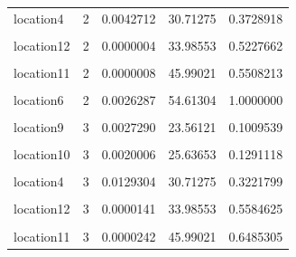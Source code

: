 \documentclass[
]{book}
\begin{document}
\begin{table}[!h]
\begin{tabular}{l|l|r|r|r}
\hline
\cellcolor{gray!6}{location2} & \cellcolor{gray!6}{2} & \cellcolor{gray!6}{0.0070132} & \cellcolor{gray!6}{27.64481} & \cellcolor{gray!6}{0.2575157}\\
\hline
location4 & 2 & 0.0042712 & 30.71275 & 0.3728918\\
\hline
\cellcolor{gray!6}{location5} & \cellcolor{gray!6}{2} & \cellcolor{gray!6}{0.0055479} & \cellcolor{gray!6}{31.35114} & \cellcolor{gray!6}{0.5227547}\\
\hline
location12 & 2 & 0.0000004 & 33.98553 & 0.5227662\\
\hline
\cellcolor{gray!6}{location7} & \cellcolor{gray!6}{2} & \cellcolor{gray!6}{0.0010378} & \cellcolor{gray!6}{35.20967} & \cellcolor{gray!6}{0.5508009}\\
\hline
location11 & 2 & 0.0000008 & 45.99021 & 0.5508213\\
\hline
\cellcolor{gray!6}{location3} & \cellcolor{gray!6}{2} & \cellcolor{gray!6}{0.0140000} & \cellcolor{gray!6}{51.70466} & \cellcolor{gray!6}{0.9289930}\\
\hline
location6 & 2 & 0.0026287 & 54.61304 & 1.0000000\\
\hline
\cellcolor{gray!6}{location8} & \cellcolor{gray!6}{3} & \cellcolor{gray!6}{0.0046896} & \cellcolor{gray!6}{19.24456} & \cellcolor{gray!6}{0.0638166}\\
\hline
location9 & 3 & 0.0027290 & 23.56121 & 0.1009539\\
\hline
\cellcolor{gray!6}{location1} & \cellcolor{gray!6}{3} & \cellcolor{gray!6}{0.0000686} & \cellcolor{gray!6}{24.62676} & \cellcolor{gray!6}{0.1018872}\\
\hline
location10 & 3 & 0.0020006 & 25.63653 & 0.1291118\\
\hline
\cellcolor{gray!6}{location2} & \cellcolor{gray!6}{3} & \cellcolor{gray!6}{0.0012573} & \cellcolor{gray!6}{27.64481} & \cellcolor{gray!6}{0.1462207}\\
\hline
location4 & 3 & 0.0129304 & 30.71275 & 0.3221799\\
\hline
\cellcolor{gray!6}{location5} & \cellcolor{gray!6}{3} & \cellcolor{gray!6}{0.0173492} & \cellcolor{gray!6}{31.35114} & \cellcolor{gray!6}{0.5582709}\\
\hline
location12 & 3 & 0.0000141 & 33.98553 & 0.5584625\\
\hline
\cellcolor{gray!6}{location7} & \cellcolor{gray!6}{3} & \cellcolor{gray!6}{0.0065945} & \cellcolor{gray!6}{35.20967} & \cellcolor{gray!6}{0.6482016}\\
\hline
location11 & 3 & 0.0000242 & 45.99021 & 0.6485305\\

\end{tabular}
\end{table}
\end{document}
